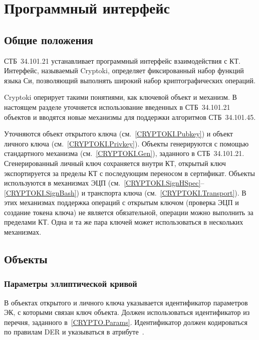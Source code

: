 \chapter{Программный интерфейс}\label{CRYPTOKI}

\section{Общие положения}\label{CRYPTOKI.Common}

СТБ~34.101.21 устанавливает программный интерфейс взаимодействия с КТ. 
Интерфейс, называемый Cryptoki, определяет фиксированный набор функций языка 
Си, позволяющий выполнять широкий набор криптографических операций. 

Cryptoki оперирует такими понятиями, как ключевой объект и механизм.
%
В настоящем разделе уточняется использование введенных
в СТБ~34.101.21 объектов и вводятся новые механизмы для поддержки
алгоритмов СТБ~34.101.45.

Уточняются объект открытого ключа (см.~\ref{CRYPTOKI.Pubkey}) и объект
личного ключа (см.~\ref{CRYPTOKI.Privkey}). Объекты генерируются с помощью 
стандартного механизма (см.~\ref{CRYPTOKI.Gen}), заданного в СТБ~34.101.21. 
%
Сгенерированный личный ключ сохраняется внутри КТ, открытый ключ 
экспортируется за пределы КТ с последующим переносом в сертификат. 
Объекты используются в механизмах ЭЦП 
(см.~\ref{CRYPTOKI.SignHSpec}--\ref{CRYPTOKI.SignBash}) и транспорта ключа 
(см.~\ref{CRYPTOKI.Transport}).
%
В этих механизмах поддержка операций с открытым ключом (проверка ЭЦП и 
создание токена ключа) не является обязательной, операции можно выполнить 
за пределами КТ. Одна и та же пара ключей может использоваться в 
нескольких механизмах.

\section{Объекты}\label{CRYPTOKI.Obj}

\subsection{Параметры эллиптической кривой}\label{CRYPTOKI.Params}

В объектах открытого и личного ключа указывается 
идентификатор параметров ЭК, с которыми связан ключ объекта.
%
Должен использоваться идентификатор из перечня, заданного 
в~\ref{CRYPTO.Params}.
%
Идентификатор должен кодироваться по правилам DER и указываться в 
атрибуте~.

